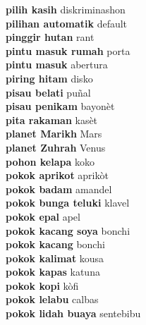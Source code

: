 \textbf{ pilih kasih  } diskriminashon \\
\textbf{ pilihan automatik  } default \\
\textbf{ pinggir hutan  } rant \\
\textbf{ pintu masuk rumah  } porta \\
\textbf{ pintu masuk  } abertura \\
\textbf{ piring hitam  } disko \\
\textbf{ pisau belati  } puñal \\
\textbf{ pisau penikam  } bayonèt \\
\textbf{ pita rakaman  } kasèt \\
\textbf{ planet Marikh  } Mars \\
\textbf{ planet Zuhrah  } Venus \\
\textbf{ pohon kelapa  } koko \\
\textbf{ pokok aprikot  } aprikòt \\
\textbf{ pokok badam  } amandel \\
\textbf{ pokok bunga teluki  } klavel \\
\textbf{ pokok epal  } apel \\
\textbf{ pokok kacang soya  } bonchi \\
\textbf{ pokok kacang  } bonchi \\
\textbf{ pokok kalimat  } kousa \\
\textbf{ pokok kapas  } katuna \\
\textbf{ pokok kopi  } kòfi \\
\textbf{ pokok lelabu  } calbas \\
\textbf{ pokok lidah buaya  } sentebibu \\
